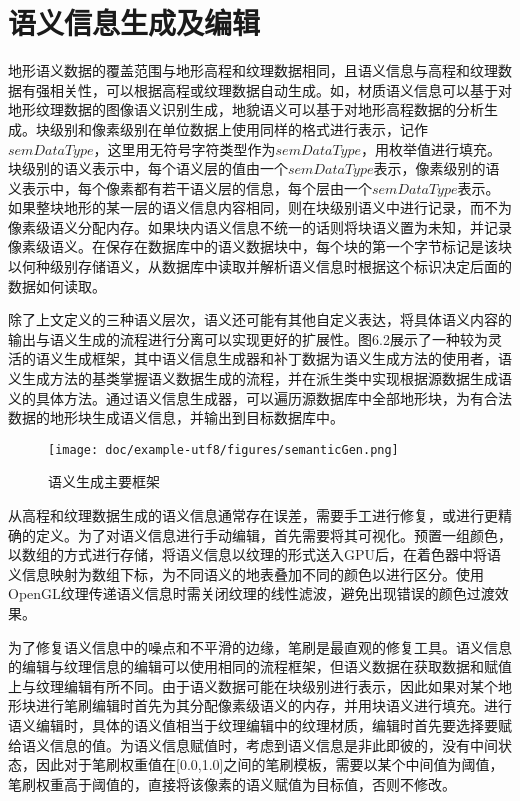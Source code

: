 \section{语义信息生成及编辑}
地形语义数据的覆盖范围与地形高程和纹理数据相同，且语义信息与高程和纹理数据有强相关性，可以根据高程或纹理数据自动生成。如，材质语义信息可以基于对地形纹理数据的图像语义识别生成，地貌语义可以基于对地形高程数据的分析生成。块级别和像素级别在单位数据上使用同样的格式进行表示，记作$semDataType$，这里用无符号字符类型作为$semDataType$，用枚举值进行填充。块级别的语义表示中，每个语义层的值由一个$semDataType$表示，像素级别的语义表示中，每个像素都有若干语义层的信息，每个层由一个$semDataType$表示。如果整块地形的某一层的语义信息内容相同，则在块级别语义中进行记录，而不为像素级语义分配内存。如果块内语义信息不统一的话则将块语义置为未知，并记录像素级语义。在保存在数据库中的语义数据块中，每个块的第一个字节标记是该块以何种级别存储语义，从数据库中读取并解析语义信息时根据这个标识决定后面的数据如何读取。\par
除了上文定义的三种语义层次，语义还可能有其他自定义表达，将具体语义内容的输出与语义生成的流程进行分离可以实现更好的扩展性。图6.2展示了一种较为灵活的语义生成框架，其中语义信息生成器和补丁数据为语义生成方法的使用者，语义生成方法的基类掌握语义数据生成的流程，并在派生类中实现根据源数据生成语义的具体方法。通过语义信息生成器，可以遍历源数据库中全部地形块，为有合法数据的地形块生成语义信息，并输出到目标数据库中。
\begin{figure}[H]
    \centering
   \texttt{[image: doc/example-utf8/figures/semanticGen.png]}
    \caption{语义生成主要框架}
\end{figure}
从高程和纹理数据生成的语义信息通常存在误差，需要手工进行修复，或进行更精确的定义。为了对语义信息进行手动编辑，首先需要将其可视化。预置一组颜色，以数组的方式进行存储，将语义信息以纹理的形式送入GPU后，在着色器中将语义信息映射为数组下标，为不同语义的地表叠加不同的颜色以进行区分。使用OpenGL纹理传递语义信息时需关闭纹理的线性滤波，避免出现错误的颜色过渡效果。\par
为了修复语义信息中的噪点和不平滑的边缘，笔刷是最直观的修复工具。语义信息的编辑与纹理信息的编辑可以使用相同的流程框架，但语义数据在获取数据和赋值上与纹理编辑有所不同。由于语义数据可能在块级别进行表示，因此如果对某个地形块进行笔刷编辑时首先为其分配像素级语义的内存，并用块语义进行填充。进行语义编辑时，具体的语义值相当于纹理编辑中的纹理材质，编辑时首先要选择要赋给语义信息的值。为语义信息赋值时，考虑到语义信息是非此即彼的，没有中间状态，因此对于笔刷权重值在[0.0,1.0]之间的笔刷模板，需要以某个中间值为阈值，笔刷权重高于阈值的，直接将该像素的语义赋值为目标值，否则不修改。\par
